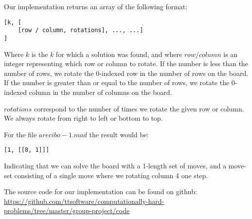 \documentclass[12pt]{article}
\begin{document}
Our implementation returns an array of the following format:

\begin{lstlisting}
[k, [
    [row / column, rotations], ..., ...]
]
\end{lstlisting}

Where $k$ is the $k$ for which a solution was found, and where $row / column$ is an integer representing which row or column to rotate.
If the number is less than the number of rows, we rotate the 0-indexed row in the number of rows on the board.
If the number is greater than or equal to the number of rows, we rotate the 0-indexed column in the number of columns on the board.

$rotations$ correspond to the number of times we rotate the given row or column. We always rotate from right to left or bottom to top.

For the file $arecibo-1.mad$ the result would be:

\begin{lstlisting}
[1, [[8, 1]]]
\end{lstlisting}

Indicating that we can solve the board with a 1-length set of moves, and a move-set consisting of a single move where we rotating column 4 one step.

The source code for our implementation can be found on github: \url{https://github.com/ttsoftware/computationally-hard-problems/tree/master/group-project/code}
\end{document}
